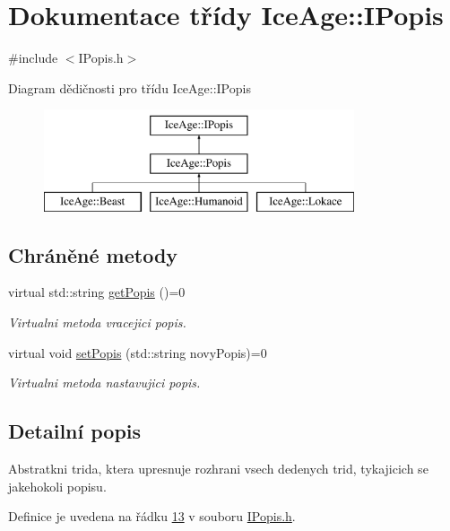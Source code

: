 \hypertarget{classIceAge_1_1IPopis}{}\section{Dokumentace třídy Ice\+Age\+:\+:I\+Popis}
\label{classIceAge_1_1IPopis}


{\ttfamily \#include $<$I\+Popis.\+h$>$}

Diagram dědičnosti pro třídu Ice\+Age\+:\+:I\+Popis\begin{figure}[H]
\begin{center}
\leavevmode
\includegraphics[height=3.000000cm]{d5/dca/classIceAge_1_1IPopis}
\end{center}
\end{figure}
\subsection*{Chráněné metody}
\begin{DoxyCompactItemize}
\item 
virtual std\+::string \hyperlink{classIceAge_1_1IPopis_a512bd006e9bcb1fe60a2cac1c7eda62b}{get\+Popis} ()=0
\begin{DoxyCompactList}\small\item\em Virtualni metoda vracejici popis. \end{DoxyCompactList}\item 
virtual void \hyperlink{classIceAge_1_1IPopis_a26bc8c194c829f2d0d616cbd482504bf}{set\+Popis} (std\+::string novy\+Popis)=0
\begin{DoxyCompactList}\small\item\em Virtualni metoda nastavujici popis. \end{DoxyCompactList}\end{DoxyCompactItemize}


\subsection{Detailní popis}
Abstratkni trida, ktera upresnuje rozhrani vsech dedenych trid, tykajicich se jakehokoli popisu. 

Definice je uvedena na řádku \hyperlink{IPopis_8h_source_l00013}{13} v souboru \hyperlink{IPopis_8h_source}{I\+Popis.\+h}.



